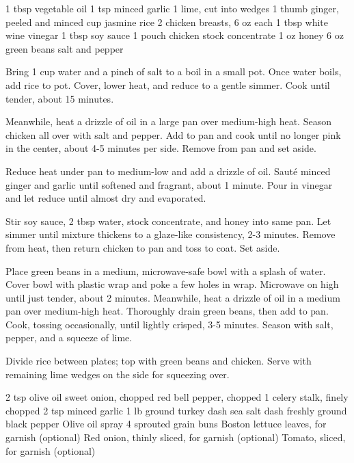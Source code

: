 \begin{ingreds}
  1 tbsp vegetable oil
  1 tsp minced garlic
  1 lime, cut into wedges
  1 thumb ginger, peeled and minced
   cup jasmine rice
  2 chicken breasts, 6 oz each
  1  tbsp white wine vinegar
  1 tbsp soy sauce
  1 pouch chicken stock concentrate
  1 oz honey
  6 oz green beans
  salt and pepper
\end{ingreds}
\begin{method}
  Bring 1 cup water and a pinch of salt
  to a boil in a small pot.
  Once water boils, add rice to pot.
  Cover, lower heat, and reduce to a gentle simmer.
  Cook until tender, about 15 minutes.

  Meanwhile, heat a drizzle of oil in a large pan
  over medium-high heat.
  Season chicken all over with salt and pepper.
  Add to pan and cook until no longer pink
  in the center, about 4-5 minutes per side.
  Remove from pan and set aside.

  Reduce heat under pan to medium-low
  and add a drizzle of oil.
  Saut\'e minced ginger and garlic until
  softened and fragrant, about 1 minute.
  Pour in vinegar and let reduce
  until almost dry and evaporated.

  Stir soy sauce, 2 tbsp water, stock concentrate,
  and honey into same pan.
  Let simmer until mixture thickens to
  a glaze-like consistency, 2-3 minutes.
  Remove from heat, then return chicken to pan
  and toss to coat.
  Set aside.

  Place green beans in a medium, microwave-safe bowl
  with a splash of water.
  Cover bowl with plastic wrap and poke
  a few holes in wrap.
  Microwave on high until just tender, about 2 minutes.
  Meanwhile, heat a drizzle of oil in a medium pan
  over medium-high heat.
  Thoroughly drain green beans, then add to pan.
  Cook, tossing occasionally, until lightly crisped, 3-5 minutes.
  Season with salt, pepper, and a squeeze of lime.

  Divide rice between plates;
  top with green beans and chicken.
  Serve with remaining lime wedges on the side for squeezing over.
\end{method}



\freezerfriendly
{}
\begin{ingreds}
  2 tsp olive oil
   sweet onion, chopped
   red bell pepper, chopped
  1 celery stalk, finely chopped
  2 tsp minced garlic
  1  lb ground turkey
  dash sea salt
  dash freshly ground black pepper
  \columnbreak
  Olive oil spray
  4 sprouted grain buns
  Boston lettuce leaves, for garnish (optional)
  Red onion, thinly sliced, for garnish (optional)
  Tomato, sliced, for garnish (optional)
\end{ingreds}

